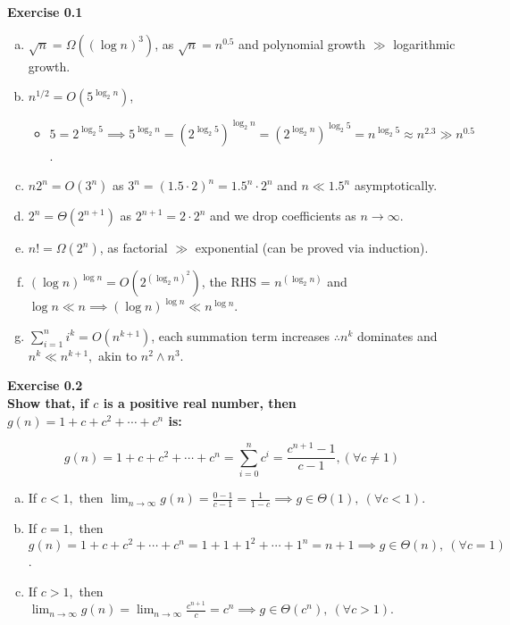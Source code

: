 \documentclass{article}
\newenvironment{problem}[2][Exercise]
    { \begin{mdframed}[backgroundcolor=gray!20] \textbf{#1 #2} \\}
    {  \end{mdframed}}
\begin{document}
\begin{problem}{0.1}
\begin{enumerate}[(a)]
        \item $\sqrt n=\Omega((\log n)^3)$, as $\sqrt n=n^{0.5}$ and polynomial growth $\gg$ logarithmic growth.
        \item $n^{1/2}=O(5^{\log_2 n})$, 
            \begin{itemize}
                \item $5=2^{\log_2 5}\implies5^{\log_2 n}
                    =(2^{\log_2 5})^{\log_2 n}
                    =(2^{\log_2 n})^{\log_2 5}
                    =n^{\log_2 5}\approx n^{2.3}\gg n^{0.5}$.
            \end{itemize}
        \item $n2^n=O(3^n)$ as $3^n = (1.5 \cdot 2)^n = 1.5^n \cdot 2^n$ and $n\ll 1.5^n$ asymptotically.
        \item $2^n=\Theta(2^{n+1})$ as $2^{n+1}=2\cdot2^{n}$ and we drop coefficients as $n\to\infty$.
        \item $n!=\Omega(2^n)$, as factorial $\gg$ exponential (can be proved via induction).
        \item $(\log n)^{\log n}=O(2^{{(\log_2 n)}^2})$, the RHS = $n^{(\log_2 n)}$ and $\log n\ll n
        \implies
        (\log n)^{\log n}\ll n^{\log n}$.
        \item $\displaystyle\sum_{i=1}^n i^k = O(n^{k+1})$, each summation term increases $\therefore n^k$ dominates and $n^k\ll n^{k+1},$ akin to $n^2\land n^3$.
    \end{enumerate}
\end{problem}

\newpage
\begin{problem}{0.2}
    \textbf{Show that, if $c$ is a positive real number, then $g(n) = 1 + c + c^2 + \cdots + c^n$ is:}

    \[
        g(n) 
        = 1 + c + c^2 + \cdots + c^n 
        = \displaystyle\sum_{i=0}^n c^i
        = \frac{c^{n+1}-1}{c-1}, 
        (\forall c\neq 1)
    \]

    \begin{enumerate}[(a)]
        \item If $c<1,$ 
        then $\displaystyle\lim_{n\to\infty}g(n)
        =\frac{0-1}{c-1}
        =\frac{1}{1-c}
        \implies \boxed{g\in\Theta(1),} \  (\forall c < 1)$.
        \item If $c=1,$ 
        then $g(n) 
        = 1 + c + c^2 + \cdots + c^n
        = 1 + 1 + 1^2 + \cdots + 1^n
        = n + 1
        \implies \boxed{g\in\Theta(n),} \  (\forall c=1)$.
        \item If $c>1,$ 
        then $\displaystyle\lim_{n\to\infty}g(n)
        =\lim_{n\to\infty}\frac{c^{n+1}}{c}
        = c^n
        \implies \boxed{g\in\Theta(c^n),} \  (\forall c > 1)$.
    \end{enumerate}
\end{problem}
\end{document}
